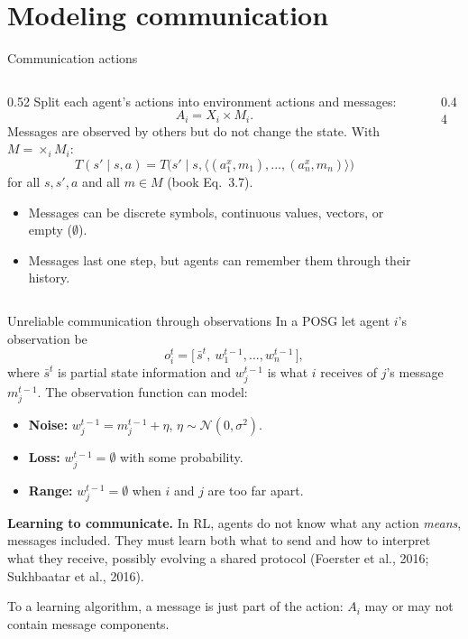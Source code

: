 \documentclass[aspectratio=169,11pt]{beamer}
\begin{document}
\section{Modeling communication}

\begin{frame}{Communication actions}
  \begin{columns}[c]
    \begin{column}{0.52\textwidth}
      Split each agent's actions into environment actions and messages:
      \[
        A_i = X_i \times M_i .
      \]
      Messages are observed by others but do not change the state. With $M = \times_i M_i$:
      \[
        T(s' \mid s, a) = T\big(s' \mid s, \langle (a^x_1, m_1), \dots, (a^x_n, m_n) \rangle\big)
      \]
      for all $s, s', a$ and all $m \in M$ (book Eq.\ 3.7).
      \begin{itemize}
        \item Messages can be discrete symbols, continuous values, vectors, or empty ($\emptyset$).
        \item Messages last one step, but agents can remember them through their history.
      \end{itemize}
    \end{column}
    \begin{column}{0.44\textwidth}
      \centering
      
    \end{column}
  \end{columns}
\end{frame}

\begin{frame}{Unreliable communication through observations}
  In a POSG let agent $i$'s observation be
  \[
    o_i^t = \big[\, \bar s^t,\ w_1^{t-1}, \dots, w_n^{t-1} \,\big],
  \]
  where $\bar s^t$ is partial state information and $w_j^{t-1}$ is what $i$ receives of $j$'s message $m_j^{t-1}$. The observation function can model:
  \begin{itemize}
    \item \textbf{Noise:} $w_j^{t-1} = m_j^{t-1} + \eta$, $\eta \sim \mathcal{N}(0, \sigma^2)$.
    \item \textbf{Loss:} $w_j^{t-1} = \emptyset$ with some probability.
    \item \textbf{Range:} $w_j^{t-1} = \emptyset$ when $i$ and $j$ are too far apart.
  \end{itemize}
  \bigskip
  \textbf{Learning to communicate.} In RL, agents do not know what any action \emph{means}, messages included. They must learn both what to send and how to interpret what they receive, possibly evolving a shared protocol (Foerster et al., 2016; Sukhbaatar et al., 2016).
  \medskip

  To a learning algorithm, a message is just part of the action: $A_i$ may or may not contain message components.
\end{frame}
\end{document}
